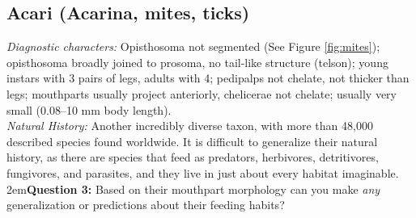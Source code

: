 \documentclass[letterpaper, 11pt]{article}
\begin{document}
\subsection{Acari (Acarina, mites, ticks)}
\noindent{}\textit{Diagnostic characters:} Opisthosoma not segmented (See Figure \ref{fig:mites}); opisthosoma broadly joined to prosoma, no tail-like structure (telson); young instars with 3 pairs of legs, adults with 4; pedipalps not chelate, not thicker than legs; mouthparts usually project anteriorly, chelicerae not chelate; usually very small (0.08--10 mm body length).\\

\noindent{}\textit{Natural History:} Another incredibly diverse taxon, with more than 48,000 described species found worldwide. It is difficult to generalize their natural history, as there are species that feed as predators, herbivores, detritivores, fungivores, and parasites, and they live in just about every habitat imaginable.  \\

\hangindent2em\textbf{Question 3:} Based on their mouthpart morphology can you make \textit{any} generalization or predictions about their feeding habits?\vspace{2cm}
\end{document}
